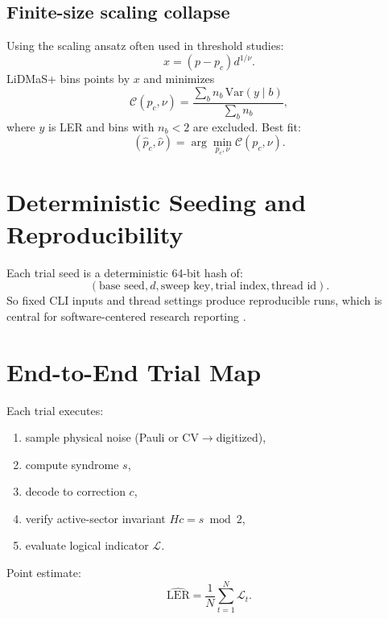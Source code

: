 \documentclass[11pt]{article}
\newcommand{\Var}{\mathrm{Var}}
\begin{document}
\subsection{Finite-size scaling collapse}
Using the scaling ansatz often used in threshold studies:
\begin{equation}
x=(p-p_c)d^{1/\nu}.
\end{equation}
LiDMaS+ bins points by $x$ and minimizes
\begin{equation}
\mathcal C(p_c,\nu)=\frac{\sum_b n_b\,\Var(y\mid b)}{\sum_b n_b},
\end{equation}
where $y$ is LER and bins with $n_b<2$ are excluded. Best fit:
\begin{equation}
(\hat p_c,\hat\nu)=\arg\min_{p_c,\nu}\mathcal C(p_c,\nu).
\end{equation}

\section{Deterministic Seeding and Reproducibility}
Each trial seed is a deterministic 64-bit hash of:
\begin{equation}
(\text{base seed},d,\text{sweep key},\text{trial index},\text{thread id}).
\end{equation}
So fixed CLI inputs and thread settings produce reproducible runs, which is central for software-centered research reporting \cite{wayo2026lidmas}.

\section{End-to-End Trial Map}
Each trial executes:
\begin{enumerate}[label=\arabic*.]
  \item sample physical noise (Pauli or CV$\rightarrow$digitized),
  \item compute syndrome $s$,
  \item decode to correction $c$,
  \item verify active-sector invariant $Hc=s\bmod 2$,
  \item evaluate logical indicator $\mathcal L$.
\end{enumerate}
Point estimate:
\begin{equation}
\widehat{\mathrm{LER}}=\frac{1}{N}\sum_{t=1}^N \mathcal L_t.
\end{equation}
\end{document}
